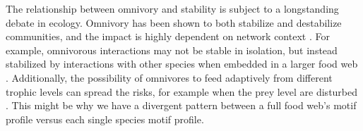 \documentclass[12pt]{article}
\begin{document}
\begin{spacing}{2.0}



The relationship between omnivory and stability is subject to a longstanding debate in ecology. Omnivory has been shown to both stabilize and destabilize communities, and the impact is highly dependent on network context \citep{bascompte2005simple, Monteiro2016, Kratina2012}. 
For example, omnivorous interactions may not be stable in isolation, but instead stabilized by interactions with other species when embedded in a larger food web \citep{Kratinaetal2012}. Additionally, the possibility of omnivores to feed adaptively from different trophic levels can spread the risks, for example when the prey level are disturbed \citep{Fagan1997}.
This might be why we have a divergent pattern between a full food web's motif profile versus each single species motif profile.


\end{spacing}
\end{document}
